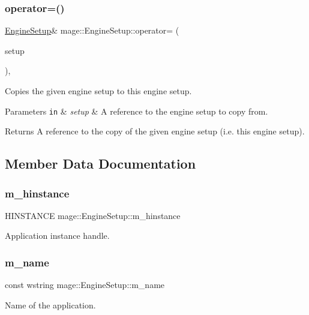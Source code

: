 \subsubsection{\texorpdfstring{operator=()}{operator=()}}
{\footnotesize\ttfamily \hyperlink{structmage_1_1_engine_setup}{Engine\+Setup}\& mage\+::\+Engine\+Setup\+::operator= (\begin{DoxyParamCaption}\item[{const \hyperlink{structmage_1_1_engine_setup}{Engine\+Setup} \&}]{setup }\end{DoxyParamCaption})\hspace{0.3cm}{\ttfamily [private]}, {\ttfamily [delete]}}

Copies the given engine setup to this engine setup.


\begin{DoxyParams}[1]{Parameters}
\mbox{\tt in}  & {\em setup} & A reference to the engine setup to copy from. \\
\hline
\end{DoxyParams}
\begin{DoxyReturn}{Returns}
A reference to the copy of the given engine setup (i.\+e. this engine setup). 
\end{DoxyReturn}


\subsection{Member Data Documentation}
\hypertarget{structmage_1_1_engine_setup_af91461305cd9aa60e22fa770395d2238}{}\label{structmage_1_1_engine_setup_af91461305cd9aa60e22fa770395d2238} 
\subsubsection{\texorpdfstring{m\+\_\+hinstance}{m\_hinstance}}
{\footnotesize\ttfamily H\+I\+N\+S\+T\+A\+N\+CE mage\+::\+Engine\+Setup\+::m\+\_\+hinstance\hspace{0.3cm}{\ttfamily [private]}}

Application instance handle. \hypertarget{structmage_1_1_engine_setup_a40fba981d4b1c30eff304b029a013009}{}\label{structmage_1_1_engine_setup_a40fba981d4b1c30eff304b029a013009} 
\subsubsection{\texorpdfstring{m\+\_\+name}{m\_name}}
{\footnotesize\ttfamily const wstring mage\+::\+Engine\+Setup\+::m\+\_\+name\hspace{0.3cm}{\ttfamily [private]}}

Name of the application. 